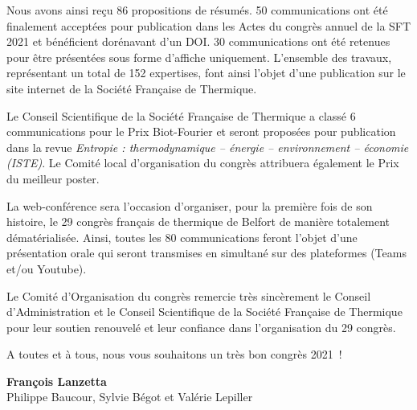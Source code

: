 Nous avons ainsi reçu 86 propositions de résumés. 50 communications ont été finalement acceptées pour publication dans les Actes du congrès annuel de la SFT 2021 et bénéficient dorénavant d'un DOI. 30 communications ont été retenues pour être présentées sous forme d'affiche uniquement. L'ensemble des travaux, représentant un total de 152 expertises, font ainsi l'objet d'une publication sur le site internet de la Société Française de Thermique.

Le Conseil Scientifique de la Société Française de Thermique a classé 6 communications pour le Prix Biot-Fourier et seront proposées pour publication dans la revue \textit{Entropie : thermodynamique – énergie – environnement – économie (ISTE)}. Le Comité local d'organisation du congrès attribuera également le Prix du meilleur poster.

La web-conférence sera l'occasion d'organiser, pour la première fois de son histoire, le 29\ieme{} congrès français de thermique de Belfort de manière totalement dématérialisée. Ainsi, toutes les 80 communications feront l'objet d'une présentation orale qui seront transmises en simultané sur des plateformes (Teams et/ou Youtube).

Le Comité d'Organisation du congrès remercie très sincèrement le Conseil d'Administration et le Conseil Scientifique de la Société Française de Thermique pour leur soutien renouvelé et leur confiance dans l'organisation du 29\ieme{} congrès.

A toutes et à tous, nous vous souhaitons un très bon congrès 2021 !


\begin{flushright}
{\bfseries François Lanzetta}\\
{Philippe Baucour, Sylvie Bégot et Valérie Lepiller}
\end{flushright}

